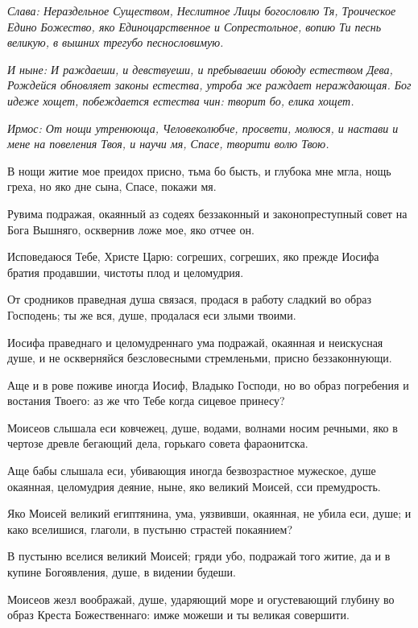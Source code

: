 \itshape Слава\normalfont{}: Нераздельное Существом, Неслитное Лицы богословлю Тя, Троическое Едино Божество, яко Единоцарственное и Сопрестольное, вопию Ти песнь великую, в вышних трегубо песнословимую.


\itshape И ныне\normalfont{}: И раждаеши, и девствуеши, и пребываеши обоюду естеством Дева, Рождейся обновляет законы естества, утроба же раждает нераждающая. Бог идеже хощет, побеждается естества чин: творит бо, елика хощет. 




\itshape Ирмос\normalfont{}: От нощи утренююща, Человеколюбче, просвети, молюся, и настави и мене на повеления Твоя, и научи мя, Спасе, творити волю Твою.


В нощи житие мое преидох присно, тьма бо бысть, и глубока мне мгла, нощь греха, но яко дне сына, Спасе, покажи мя.


Рувима подражая, окаянный аз содеях беззаконный и законопреступный совет на Бога Вышняго, осквернив ложе мое, яко отчее он.


Исповедаюся Тебе, Христе Царю: согреших, согреших, яко прежде Иосифа братия продавшии, чистоты плод и целомудрия.


От сродников праведная душа связася, продася в работу сладкий во образ Господень; ты же вся, душе, продалася еси злыми твоими.


Иосифа праведнаго и целомудреннаго ума подражай, окаянная и неискусная душе, и не оскверняйся безсловесными стремленьми, присно беззаконнующи.


Аще и в рове поживе иногда Иосиф, Владыко Господи, но во образ погребения и востания Твоего: аз же что Тебе когда сицевое принесу?


Моисеов слышала еси ковчежец, душе, водами, волнами носим речными, яко в чертозе древле бегающий дела, горькаго совета фараонитска.


Аще бабы слышала еси, убивающия иногда безвозрастное мужеское, душе окаянная, целомудрия деяние, ныне, яко великий Моисей, сси премудрость.


Яко Моисей великий египтянина, ума, уязвивши, окаянная, не убила еси, душе; и како вселишися, глаголи, в пустыню страстей покаянием?


В пустыню вселися великий Моисей; гряди убо, подражай того житие, да и в купине Богоявления, душе, в видении будеши.


Моисеов жезл воображай, душе, ударяющий море и огустевающий глубину во образ Креста Божественнаго: имже можеши и ты великая совершити.


